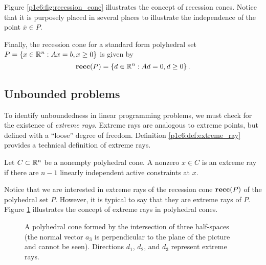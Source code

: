 Figure \ref{p1c6:fig:recession_cone} illustrates the concept of recession cones. Notice that it is purposely placed in several places to illustrate the independence of the point $\overline{x} \in P$.

Finally, the recession cone for a standard form polyhedral set $P = \left\{ x \in \mathbb{R}^n : Ax = b, x \geq 0 \right \}$ is given by 
%
\begin{equation*}
	{\bf recc}(P) = \left\{ d \in \mathbb{R}^n : Ad = 0, d \geq 0 \right \}.	
\end{equation*} 


\subsection{Unbounded problems}

To identify unboundedness in linear programming problems, we must check for the existence of \emph{extreme rays}. Extreme rays are analogous to extreme points, but defined with a ``loose'' degree of freedom. Definition \ref{p1c6:def:extreme_ray} provides a technical definition of extreme rays.

\begin{definition} \label{p1c6:def:extreme_ray}
	Let $C \subset \mathbb{R}^n$ be a nonempty polyhedral cone. A nonzero $x \in C$ is an extreme ray if there are $n-1$ linearly independent active constraints at $x$.
\end{definition} 

Notice that we are interested in extreme rays of the recession cone ${\bf recc} (P)$ of the polyhedral set $P$. However, it is typical to say that they are extreme rays of $P$. Figure \ref{p1c6:fig:extreme_rays} illustrates the concept of extreme rays in polyhedral cones.

\begin{figure}[h]
	\caption{A polyhedral cone formed by the intersection of three half-spaces (the normal vector $a_3$ is perpendicular to the plane of the picture and cannot be seen). Directions $d_1$, $d_2$, and $d_3$ represent extreme rays.} \label{p1c6:fig:extreme_rays}	
\end{figure}

